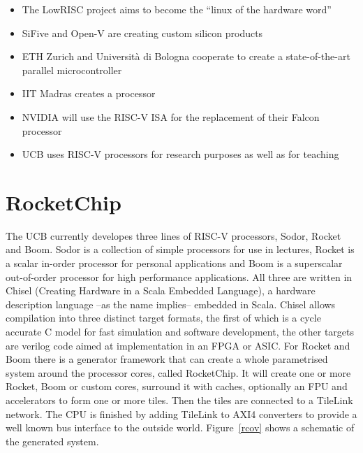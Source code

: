 \documentclass[journal,a4paper]{IEEEtran}
\def\CC/{C\nolinebreak\hspace{-.05em}\raisebox{.4ex}{\tiny\textbf{+}}\nolinebreak\hspace{-.03em}\raisebox{.4ex}{\tiny\textbf{+}}}
\begin{document}
\begin{itemize}
	\item The LowRISC project aims to become the ``linux of the hardware word''
	\item SiFive and Open-V are creating custom silicon products
	\item ETH Zurich and Università di Bologna cooperate to create a state-of-the-art parallel microcontroller
	\item IIT Madras creates a processor
	\item NVIDIA will use the RISC-V ISA for the replacement of their Falcon processor
	\item UCB uses RISC-V processors for research purposes as well as for teaching
\end{itemize}

\section{RocketChip}
The UCB currently developes three lines of RISC-V processors, Sodor, Rocket and Boom.
Sodor is a collection of simple processors for use in lectures, Rocket is a scalar in-order processor for personal applications and Boom is a superscalar out-of-order processor for high performance applications.
All three are written in Chisel (Creating Hardware in a Scala Embedded Language), a hardware description language --as the name implies-- embedded in Scala.
Chisel allows compilation into three distinct target formats, the first of which is a cycle accurate \CC/ model for fast simulation and software development, the other targets are verilog code aimed at implementation in an FPGA or ASIC\@.
For Rocket and Boom there is a generator framework that can create a whole parametrised system around the processor cores, called RocketChip.
It will create one or more Rocket, Boom or custom cores, surround it with caches, optionally an FPU and accelerators to form one or more tiles. Then the tiles are connected to a TileLink network. The CPU is finished by adding TileLink to AXI4 converters to provide a well known bus interface to the outside world. Figure~\ref{rcov} shows a schematic of the generated system.

\end{document}
